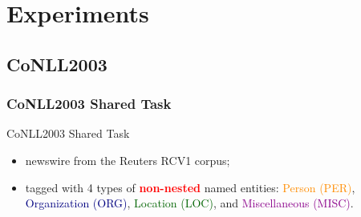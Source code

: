 \documentclass{beamer}
\begin{document}
\section{Experiments} 


\subsection{CoNLL2003}

\begin{frame}
\frametitle{CoNLL2003 Shared Task}
\begin{block}{CoNLL2003 Shared Task}
	\begin{itemize}
	\item newswire from the Reuters RCV1 corpus;
	\item tagged with 4 types of \textbf{\textcolor{red}{non-nested}} named entities: 
			\textcolor{darkorange}{Person (PER)}, 
			\textcolor{navy}{Organization (ORG)},
			\textcolor{darkgreen}{Location (LOC)}, and
			\textcolor{darkmagenta}{Miscellaneous (MISC)}.
	\end{itemize}
\end{block}
\begin{table}
    \centering
    \caption{\scriptsize Data distribution of CoNLL2003}
    \label{tbl:conll2003stat}
\end{table}
\end{frame}
\end{document}

